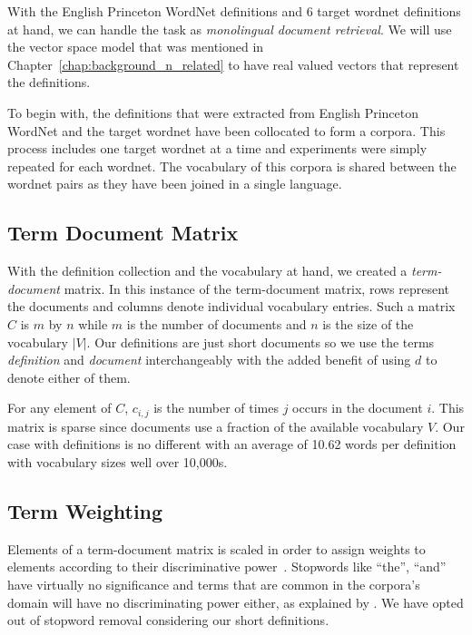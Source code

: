 With the English Princeton WordNet definitions and 6 target wordnet definitions at hand, we can handle the task as \emph{monolingual document retrieval}.
We will use the vector space model that was mentioned in Chapter~\ref{chap:background_n_related} to have real valued vectors that represent the definitions.

To begin with, the definitions that were extracted from English Princeton WordNet and the target wordnet have been collocated to form a corpora.
This process includes one target wordnet at a time and experiments were simply repeated for each wordnet.
The vocabulary of this corpora is shared between the wordnet pairs as they have been joined in a single language.

\subsection{Term Document Matrix}%
\label{sub:term_document_matrix}

With the definition collection and the vocabulary at hand, we created a \emph{term-document} matrix.
In this instance of the term-document matrix, rows represent the documents and columns denote individual vocabulary entries.
Such a matrix $C$ is $m$ by $n$ while $m$ is the number of documents and $n$ is the size of the vocabulary $|V|$.
Our definitions are just short documents so we use the terms \emph{definition} and \emph{document} interchangeably with the added benefit of using $d$ to denote either of them.

For any element of $C$, $c_{i,j}$ is the number of times $j$ occurs in the document $i$.
This matrix is sparse since documents use a fraction of the available vocabulary $V$.
Our case with definitions is no different with an average of 10.62 words per definition with vocabulary sizes well over 10,000s.

\subsection{Term Weighting}%
\label{sub:term_weighting}

Elements of a term-document matrix is scaled in order to assign weights to elements according to their discriminative power~\cite{manning_introduction_2009}.
Stopwords like \enquote{the}, \enquote{and} have virtually no significance and terms that are common in the corpora's domain will have no discriminating power either, as explained by \textcite{manning_introduction_2009}.
We have opted out of stopword removal considering our short definitions.

